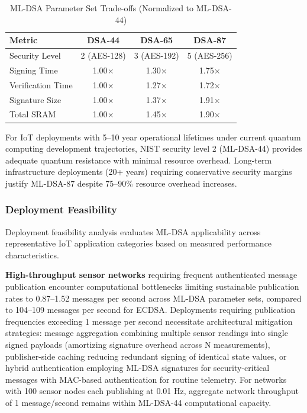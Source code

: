 \documentclass[final, twoside]{IEEEtran} %
\begin{document}
\begin{table}[h]
	\centering
	\caption{ML-DSA Parameter Set Trade-offs (Normalized to ML-DSA-44)}
	\label{tab:parameter-tradeoffs}
	\begin{tabular}{lccc}
		\toprule
		\textbf{Metric}   & \textbf{DSA-44} & \textbf{DSA-65} & \textbf{DSA-87} \\
		\midrule
		Security Level    & 2 (AES-128)     & 3 (AES-192)     & 5 (AES-256)     \\
		Signing Time      & 1.00$\times$    & 1.30$\times$    & 1.75$\times$    \\
		Verification Time & 1.00$\times$    & 1.27$\times$    & 1.72$\times$    \\
		Signature Size    & 1.00$\times$    & 1.37$\times$    & 1.91$\times$    \\
		Total SRAM        & 1.00$\times$    & 1.45$\times$    & 1.90$\times$    \\
		\bottomrule
	\end{tabular}
\end{table}

For IoT deployments with 5--10 year operational lifetimes under current quantum computing development trajectories, NIST security level 2 (ML-DSA-44) provides adequate quantum resistance with minimal resource overhead. Long-term infrastructure deployments (20+ years) requiring conservative security margins justify ML-DSA-87 despite 75--90\% resource overhead increases.

\subsubsection{Deployment Feasibility}

Deployment feasibility analysis evaluates ML-DSA applicability across representative IoT application categories based on measured performance characteristics.

\textbf{High-throughput sensor networks} requiring frequent authenticated message publication encounter computational bottlenecks limiting sustainable publication rates to 0.87--1.52 messages per second across ML-DSA parameter sets, compared to 104--109 messages per second for ECDSA. Deployments requiring publication frequencies exceeding 1 message per second necessitate architectural mitigation strategies: message aggregation combining multiple sensor readings into single signed payloads (amortizing signature overhead across N measurements), publisher-side caching reducing redundant signing of identical state values, or hybrid authentication employing ML-DSA signatures for security-critical messages with MAC-based authentication for routine telemetry. For networks with 100 sensor nodes each publishing at 0.01 Hz, aggregate network throughput of 1 message/second remains within ML-DSA-44 computational capacity.
\end{document}
